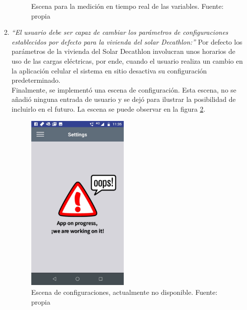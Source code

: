 \begin{enumerate}
\begin{figure}[htbp]
		\caption{Escena para la medición en tiempo real de las variables. Fuente: propia}
		\label{fig_15}
	\end{figure}
	\item  \textit{``El usuario debe ser capaz de cambiar los parámetros de configuraciones establecidos por defecto para la vivienda del solar Decathlon:''} Por defecto los parámetros de la vivienda del Solar Decathlon involucran unos horarios de uso de las cargas eléctricas, por ende, cuando el usuario realiza un cambio en la aplicación celular el sistema en sitio desactiva su configuración predeterminado. 
	\vspace{0.5cm}\\
	Finalmente, se implementó una escena de configuración. Esta escena, no se añadió ninguna entrada de usuario y se dejó para ilustrar la posibilidad de incluirlo en el futuro. La escena se puede observar en la figura \ref{fig_18}.
	
	\begin{figure}[htbp]
		\centerline{\includegraphics[width=5cm]{./figuras/mobile_settings.jpeg}}
		\caption{Escena de configuraciones, actualmente no disponible. Fuente: propia}
		\label{fig_18}
	\end{figure}
	

\end{enumerate}
